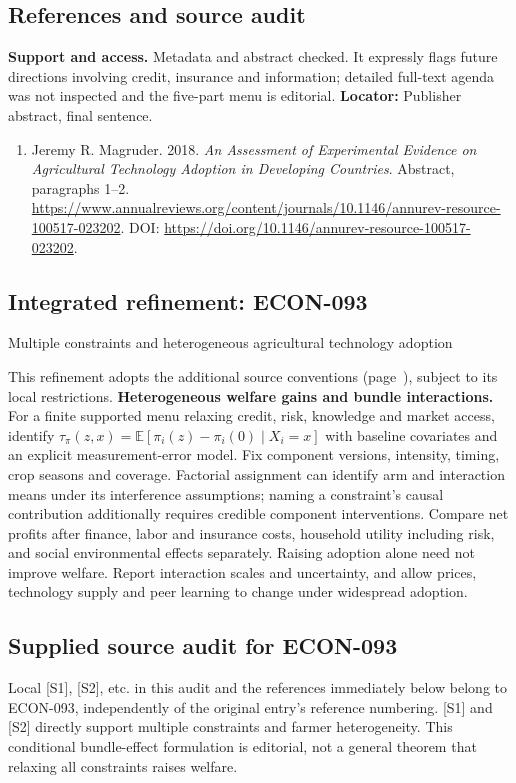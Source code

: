 \documentclass[11pt,a4paper]{article}
\begin{document}
\subsection*{References and source audit}
\textbf{Support and access.} Metadata and abstract checked. It expressly flags future directions involving credit, insurance and information; detailed full-text agenda was not inspected and the five-part menu is editorial. \textbf{Locator:} Publisher abstract, final sentence.
\begin{enumerate}\raggedright
\item\hypertarget{definitions:source:30007659:1}{} Jeremy R. Magruder. 2018. \emph{An Assessment of Experimental Evidence on Agricultural Technology Adoption in Developing Countries}. Abstract, paragraphs 1–2.
\url{https://www.annualreviews.org/content/journals/10.1146/annurev-resource-100517-023202}.
DOI: \url{https://doi.org/10.1146/annurev-resource-100517-023202}.
\end{enumerate}

\subsection*{Integrated refinement: ECON-093}
{\sffamily\small\color{muted}Multiple constraints and heterogeneous agricultural technology adoption\par}
This refinement adopts the additional source conventions
(page~\pageref{audited:conventions}), subject to its local restrictions.
\textbf{Heterogeneous welfare gains and bundle interactions.}
For a finite supported menu relaxing credit, risk, knowledge and market access,
identify $\tau_\pi(z,x)=\mathbb E[\pi_i(z)-\pi_i(0)\mid X_i=x]$ with baseline
covariates and an explicit measurement-error model. Fix component versions,
intensity, timing, crop seasons and coverage. Factorial assignment can identify
arm and interaction means under its interference assumptions; naming a
constraint's causal contribution additionally requires credible component
interventions. Compare net profits after finance, labor and insurance costs,
household utility including risk, and social environmental effects separately.
Raising adoption alone need not improve welfare. Report interaction scales and
uncertainty, and allow prices, technology supply and peer learning to change
under widespread adoption.
\subsection*{Supplied source audit for ECON-093}
Local [S1], [S2], etc. in this audit and the references immediately below
belong to ECON-093, independently of the original entry's reference numbering.
[S1] and [S2] directly support multiple constraints and farmer heterogeneity. This conditional bundle-effect formulation is editorial, not a general theorem that relaxing all constraints raises welfare.
\end{document}
